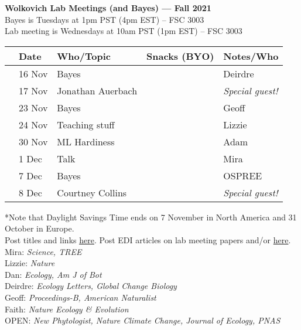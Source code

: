 \documentclass[11pt]{article}
\begin{document}
 
\raggedright
{}

\begin{center} 
{\large \textbf{Wolkovich Lab Meetings (and Bayes) --- Fall 2021}} \\ [2pt]
Bayes is Tuesdays at 1pm PST (4pm EST) -- FSC 3003\\
Lab meeting is Wednesdays at 10am PST (1pm EST) -- FSC 3003\\
\end{center} 

\begin{center}
\begin{tabular}{ p{0.2 cm}  p{2 cm}  p{4.5 cm}  p{3 cm}  p{3.5 cm} }  \hline \hline
 & \textbf{Date}
   & \textbf{Who/Topic}
      & \textbf{Snacks (BYO)} 
         & \textbf{Notes/Who} \\ 
\hline \hline
 & 16 Nov & Bayes &       & Deirdre\\\hline
 & 17  Nov & Jonathan Auerbach & & \emph{Special guest!}   \\\hline
 & 23 Nov & Bayes &       & Geoff\\\hline  
 & 24 Nov & Teaching stuff &       & Lizzie  \\\hline
 & 30 Nov & ML Hardiness  &     & Adam \\\hline %
 & 1 Dec &  Talk &       &   Mira \\\hline
 & 7 Dec & Bayes &    & OSPREE\\\hline
 & 8 Dec &  Courtney Collins &    & \emph{Special guest!}  \\\hline %
\hline
\end{tabular}
\end{center}
*Note that Daylight Savings Time ends on 7 November in North America and 31 October in Europe.\\
\vspace{7pt}
 Post titles and links \href{https://docs.google.com/document/d/1j0WdDbjdp8ERLSO7whvtnP-tOblYMlX33TSCXy_uRKo/edit?usp=sharing}{\underline{here}}. Post EDI articles on lab meeting papers and/or  \href{https://docs.google.com/document/d/18VbP-03oD0BsArxYm60g1ZvvFL7IoA3-6rpdHb1eLPw/edit#heading=h.gsqcglkhxkzg}{here}.\\
Mira: \emph{Science, TREE} \\
Lizzie: \emph{Nature}\\
Dan: \emph{Ecology, Am J of Bot }\\
Deirdre: \emph{Ecology Letters, Global Change Biology}\\
Geoff: \emph{Proceedings-B, American Naturalist} \\
Faith: \emph{Nature Ecology \& Evolution}\\
OPEN: \emph{New Phytologist, Nature Climate Change, Journal of Ecology, PNAS}\\
\end{document}
